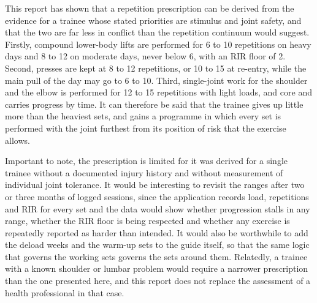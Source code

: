 \documentclass[11pt,a4paper]{article}
\begin{document}
This report has shown that a repetition prescription can be derived from the evidence for a trainee whose stated priorities are stimulus and joint safety, and that the two are far less in conflict than the repetition continuum would suggest. Firstly, compound lower-body lifts are performed for 6 to 10 repetitions on heavy days and 8 to 12 on moderate days, never below 6, with an RIR floor of 2. Second, presses are kept at 8 to 12 repetitions, or 10 to 15 at re-entry, while the main pull of the day may go to 6 to 10. Third, single-joint work for the shoulder and the elbow is performed for 12 to 15 repetitions with light loads, and core and carries progress by time. It can therefore be said that the trainee gives up little more than the heaviest sets, and gains a programme in which every set is performed with the joint furthest from its position of risk that the exercise allows.

Important to note, the prescription is limited for it was derived for a single trainee without a documented injury history and without measurement of individual joint tolerance. It would be interesting to revisit the ranges after two or three months of logged sessions, since the application records load, repetitions and RIR for every set and the data would show whether progression stalls in any range, whether the RIR floor is being respected and whether any exercise is repeatedly reported as harder than intended. It would also be worthwhile to add the deload weeks and the warm-up sets to the guide itself, so that the same logic that governs the working sets governs the sets around them. Relatedly, a trainee with a known shoulder or lumbar problem would require a narrower prescription than the one presented here, and this report does not replace the assessment of a health professional in that case.
\end{document}
